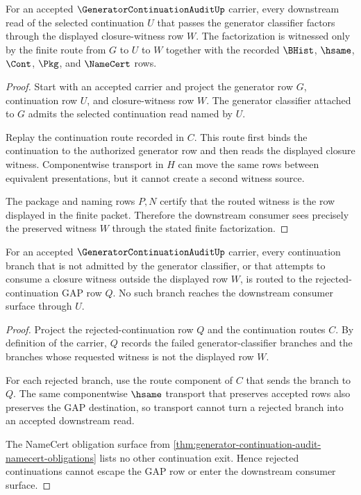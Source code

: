 \begin{theorem}
\label{thm:generator-continuation-audit-witness-preservation}
For an accepted $\GeneratorContinuationAuditUp$ carrier, every downstream read of the selected continuation $U$ that passes the generator classifier factors through the displayed closure-witness row $W$. The factorization is witnessed only by the finite route from $G$ to $U$ to $W$ together with the recorded $\BHist$, $\hsame$, $\Cont$, $\Pkg$, and $\NameCert$ rows.
\end{theorem}
\begin{proof}
Start with an accepted carrier and project the generator row $G$, continuation row $U$, and closure-witness row $W$. The generator classifier attached to $G$ admits the selected continuation read named by $U$.

Replay the continuation route recorded in $C$. This route first binds the continuation to the authorized generator row and then reads the displayed closure witness. Componentwise transport in $H$ can move the same rows between equivalent presentations, but it cannot create a second witness source.

The package and naming rows $P,N$ certify that the routed witness is the row displayed in the finite packet. Therefore the downstream consumer sees precisely the preserved witness $W$ through the stated finite factorization.
\end{proof}

\begin{theorem}
\label{thm:generator-continuation-audit-gap-nonescape}
For an accepted $\GeneratorContinuationAuditUp$ carrier, every continuation branch that is not admitted by the generator classifier, or that attempts to consume a closure witness outside the displayed row $W$, is routed to the rejected-continuation GAP row $Q$. No such branch reaches the downstream consumer surface through $U$.
\end{theorem}
\begin{proof}
Project the rejected-continuation row $Q$ and the continuation routes $C$. By definition of the carrier, $Q$ records the failed generator-classifier branches and the branches whose requested witness is not the displayed row $W$.

For each rejected branch, use the route component of $C$ that sends the branch to $Q$. The same componentwise $\hsame$ transport that preserves accepted rows also preserves the GAP destination, so transport cannot turn a rejected branch into an accepted downstream read.

The NameCert obligation surface from \autoref{thm:generator-continuation-audit-namecert-obligations} lists no other continuation exit. Hence rejected continuations cannot escape the GAP row or enter the downstream consumer surface.
\end{proof}

